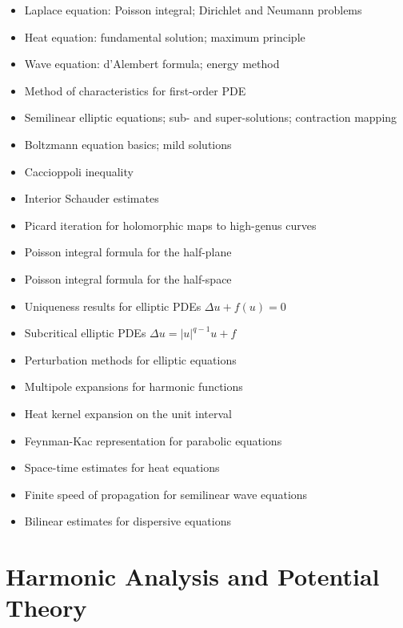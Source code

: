\documentclass{amsart}
\begin{document}
\begin{itemize}
  \item Laplace equation: Poisson integral; Dirichlet and Neumann problems
  \item Heat equation: fundamental solution; maximum principle
  \item Wave equation: d'Alembert formula; energy method
  \item Method of characteristics for first-order PDE
  \item Semilinear elliptic equations; sub- and super-solutions; contraction mapping
  \item Boltzmann equation basics; mild solutions
  \item Caccioppoli inequality
  \item Interior Schauder estimates
  \item Picard iteration for holomorphic maps to high-genus curves
  \item Poisson integral formula for the half-plane
  \item Poisson integral formula for the half-space
  \item Uniqueness results for elliptic PDEs $\Delta u + f(u) = 0$
  \item Subcritical elliptic PDEs $\Delta u = |u|^{q-1}u + f$
  \item Perturbation methods for elliptic equations
  \item Multipole expansions for harmonic functions
  \item Heat kernel expansion on the unit interval
  \item Feynman-Kac representation for parabolic equations
  \item Space-time estimates for heat equations
  \item Finite speed of propagation for semilinear wave equations
  \item Bilinear estimates for dispersive equations
\end{itemize}

\section{Harmonic Analysis and Potential Theory}
\end{document}
